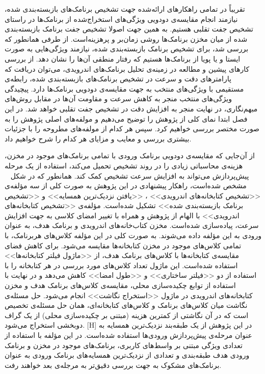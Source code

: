 

\label{ourwork}
تقریباً در تمامی راهکار‌های ارائه‌شده جهت تشخیص برنامک‌های بازبسته‌بندی شده، نیازمند انجام مقایسه‌ی دودویی ویژگی‌های استخراج‌شده از برنامک‌ها در راستای تشخیص جفت تقلبی هستیم. به همین جهت اصولا تشخیص جفت برنامک بازبسته‌بندی شده از میان مخزن‌ برنامک‌ها روشی زمان‌بر و پرهزینه‌است. از طرفی همانطور که بررسی شد، برای تشخیص برنامک‌ بازبسته‌بندی شده، نیازمند ویژگی‌هایی به صورت ایستا و یا پویا از برنامک‌ها هستیم که رفتار منطقی آن‌ها را نشان دهد. از بررسی کار‌های پیشین و مطالعه‌ در زمینه‌ی تحلیل برنامک‌های اندرویدی، می‌توان دریافت که پارامتر‌های دقت و سرعت در تشخیص برنامک‌های بازبسته‌بندی شده، رابطه‌ی مستقیمی با ویژگی‌های منتخب به جهت مقایسه‌ی دودویی برنامک‌ها دارد. پیچیدگی ویژگی‌های منتخب منجر به کاهش سرعت و مقاومت آن‌ها در مقابل روش‌های مبهم‌نگاری، در نهایت منجر به  افزایش دقت در تشخیص جفت تقلبی خواهد شد. در این فصل ابتدا نمای کلی از پژوهش را توضیح می‌دهیم و مولفه‌های اصلی پژوهش‌ را به صورت مختصر بررسی خواهیم کرد. سپس هر کدام از مولفه‌های مطروحه را با جزئیات بیشتری بررسی و معایب و مزایای هر کدام را شرح خواهیم داد.

از آن‌جایی که مقایسه‌ی دودویی برنامک‌ ورودی با تمامی برنامک‌های موجود در مخزن، هزینه‌ی محاسباتی زیادی را در روند تشخیص تحمیل می‌کند،‌ استفاده از یک مرحله پیش‌پردازش می‌تواند به افزایش سرعت تشخیص کمک کند. همانطور که در شکل ~ مشخص شده‌است، راهکار پیشنهادی در این پژوهش به صورت کلی از سه مؤلفه‌ی <<تشخیص کتابخانه‌های اندرویدی>> ، <<یافتن نزدیک‌ترین همسایه>> و <<تشخیص برنامک بازبسته‌بندی‌ شده>> تشکیل شده‌است. مؤلفه‌ی <<تشخیص کتابخانه‌های اندرویدی>> با الهام از پژوهش  و همراه با تغییر امضا‌ی کلاسی به جهت افزایش سرعت، پیاده‌سازی شده‌است. مخزن‌ کتاب‌خانه‌های اندرویدی و برنامک هدف، به عنوان ورودی به این مؤلفه‌ داده می‌شوند. به صورت کلی در این مؤلفه کلاس‌های هربرنامک،‌ با تمامی کلاس‌های موجود در مخزن کتابخانه‌ها مقایسه‌ می‌شود. برای کاهش فضای مقایسه‌ی کتابخانه‌ها با کلاس‌های برنامک هدف، از <<ماژول فیلتر کتابخانه‌ها>> استفاده شده‌است. این ماژول تعداد کلاس‌های مورد بررسی در هر کتابخانه‌ را با استفاده از دو <<فیلتر ساختاری>> و <<طول امضا>> کاهش می‌دهد و در نهایت با استفاده از توابع چکیده‌سازی محلی، مقایسه‌ی کلاس‌های برنامک هدف و مخزن کتابخانه‌های اندرویدی در ماژول <<استخراج نگاشت>>‌ انجام می‌شود. حل مسئله‌ی نگاشت میان کلاس‌های برنامک و کلاس‌های کتابخانه‌ای، همان حل مسئله‌ی تخصیص است که در آن نگاشتی از کمترین هزینه (مبتنی بر چکیده‌سازی محلی) از یک گراف دوبخشی استخراج می‌شود.
[H]
\vspace{1em}
در این پژوهش از یک طبقه‌بند نزدیک‌ترین همسایه به عنوان مرحله‌ی پیش‌پردازش ورودی‌ها استفاده شده‌است. در این مؤلفه با استفاده از تعدادی ویژگی‌ مبتنی بر واسط‌های کاربری، برنامک‌های موجود در مخزن و برنامک ورودی هدف طبقه‌بندی و تعدادی از نزدیک‌ترین همسایه‌های برنامک ورودی به عنوان برنامک‌های مشکوک به جهت بررسی دقیق‌تر به مرجله‌ی بعد خواهند رفت.

